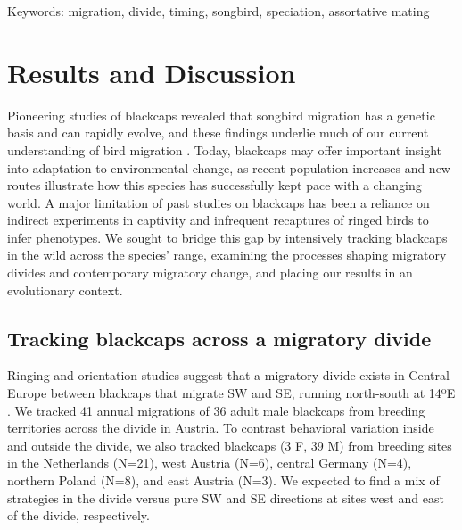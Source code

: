 \documentclass[a4paper, nobind]{templates/ociamthesis}
\begin{document}
Keywords: migration, divide, timing, songbird, speciation, assortative mating

\hypertarget{results-and-discussion}{%
\section{Results and Discussion}\label{results-and-discussion}}

Pioneering studies of blackcaps revealed that songbird migration has a genetic basis and can rapidly evolve, and these findings underlie much of our current understanding of bird migration \autocite{bertholdEvolutionaryAspectsMigratory1988,helbigInheritanceMigratoryDirection1991,bertholdRapidMicroevolutionMigratory1992,bertholdHeritabilityMigratoryActivity1994,helbigGeneticBasisMode1996,pulidoFrequencyMigrantsMigratory1996,pulidoHeritabilityTimingAutumn2001,bearhopAssortativeMatingMechanism2005,pulidoGeneticsEvolutionAvian2007,rolshausenContemporaryEvolutionReproductive2009,pulidoCurrentSelectionLower2010,muellerIdentificationGeneAssociated2011}.
Today, blackcaps may offer important insight into adaptation to environmental change, as recent population increases \autocite{ebcc/birdlife/rspb/csoTrendsCommonBirds2018} and new routes \autocite{bertholdRapidMicroevolutionMigratory1992} illustrate how this species has successfully kept pace with a changing world.
A major limitation of past studies on blackcaps has been a reliance on indirect experiments in captivity \autocites[see][]{zunigaAbruptSwitchMigratory2016}{vandorenProgrammedFlexibleLongterm2017} and infrequent recaptures of ringed birds to infer phenotypes.
We sought to bridge this gap by intensively tracking blackcaps in the wild across the species' range, examining the processes shaping migratory divides and contemporary migratory change, and placing our results in an evolutionary context.

\hypertarget{tracking-blackcaps-across-a-migratory-divide}{%
\subsection{Tracking blackcaps across a migratory divide}\label{tracking-blackcaps-across-a-migratory-divide}}

Ringing and orientation studies suggest that a migratory divide exists in Central Europe between blackcaps that migrate SW and SE, running north-south at 14ºE \autocite{helbigPopulationDifferentiationMigratory1992,helbigSESWmigratingBlackcap1991}. We tracked 41 annual migrations of 36 adult male blackcaps from breeding territories across the divide in Austria. To contrast behavioral variation inside and outside the divide, we also tracked blackcaps (3 F, 39 M) from breeding sites in the Netherlands (N=21), west Austria (N=6), central Germany (N=4), northern Poland (N=8), and east Austria (N=3). We expected to find a mix of strategies in the divide versus pure SW and SE directions at sites west and east of the divide, respectively.
\end{document}
